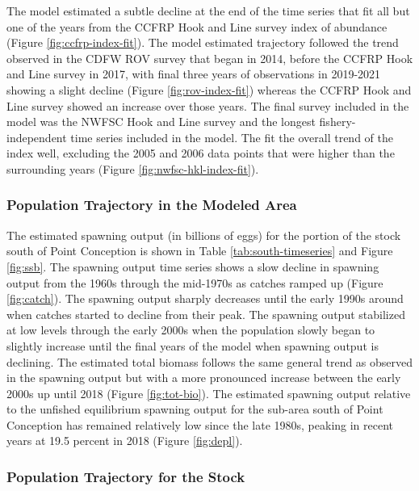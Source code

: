 \documentclass[11pt,
  english,
  letterpaper,
]{article}
\begin{document}
The model estimated a subtle decline at the end of the time series that fit all but one of the years from the CCFRP Hook and Line survey index of abundance (Figure \ref{fig:ccfrp-index-fit}). The model estimated trajectory followed the trend observed in the CDFW ROV survey that began in 2014, before the CCFRP Hook and Line survey in 2017, with final three years of observations in 2019-2021 showing a slight decline (Figure \ref{fig:rov-index-fit}) whereas the CCFRP Hook and Line survey showed an increase over those years. The final survey included in the model was the NWFSC Hook and Line survey and the longest fishery-independent time series included in the model. The fit the overall trend of the index well, excluding the 2005 and 2006 data points that were higher than the surrounding years (Figure \ref{fig:nwfsc-hkl-index-fit}).

\hypertarget{population-trajectory-in-the-modeled-area}{%
\subsubsection{Population Trajectory in the Modeled Area}\label{population-trajectory-in-the-modeled-area}}

The estimated spawning output (in billions of eggs) for the portion of the stock south of Point Conception is shown in Table \ref{tab:south-timeseries} and Figure \ref{fig:ssb}. The spawning output time series shows a slow decline in spawning output from the 1960s through the mid-1970s as catches ramped up (Figure \ref{fig:catch}). The spawning output sharply decreases until the early 1990s around when catches started to decline from their peak. The spawning output stabilized at low levels through the early 2000s when the population slowly began to slightly increase until the final years of the model when spawning output is declining. The estimated total biomass follows the same general trend as observed in the spawning output but with a more pronounced increase between the early 2000s up until 2018 (Figure \ref{fig:tot-bio}). The estimated spawning output relative to the unfished equilibrium spawning output for the sub-area south of Point Conception has remained relatively low since the late 1980s, peaking in recent years at 19.5 percent in 2018 (Figure \ref{fig:depl}).

\hypertarget{population-trajectory-for-the-stock}{%
\subsubsection{Population Trajectory for the Stock}\label{population-trajectory-for-the-stock}}
\end{document}
